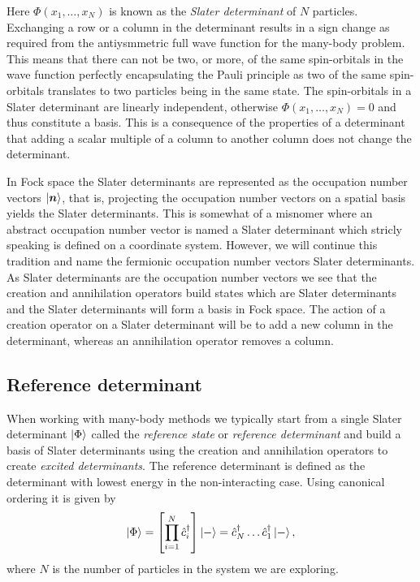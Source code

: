         Here $\Phi(x_1, \dots, x_N)$ is known as the \emph{Slater determinant}
        of $N$ particles.
        Exchanging a row or a column in the determinant results in a sign change
        as required from the antiysmmetric full wave function for the many-body
        problem.
        This means that there can not be two, or more, of the same spin-orbitals
        in the wave function perfectly encapsulating the Pauli principle as two
        of the same spin-orbitals translates to two particles being in the same
        state.
        The spin-orbitals in a Slater determinant are linearly independent,
        otherwise $\Phi(x_1, \dots, x_N) = 0$ and thus constitute a basis.
        This is a consequence of the properties of a determinant that adding a
        scalar multiple of a column to another column does not change the
        determinant.

        In Fock space the Slater determinants are represented as the occupation
        number vectors $\ket{\boldsymbol{n}}$, that is, projecting the occupation
        number vectors on a spatial basis yields the Slater determinants.
        This is somewhat of a misnomer where an abstract occupation number
        vector is named a Slater determinant which stricly speaking is defined
        on a coordinate system.
        However, we will continue this tradition and name the fermionic
        occupation number vectors Slater determinants.
        As Slater determinants are the occupation number vectors we see that the
        creation and annihilation operators build states which are Slater
        determinants and the Slater determinants will form a basis in Fock
        space.
        The action of a creation operator on a Slater determinant will be to add
        a new column in the determinant, whereas an annihilation operator
        removes a column.

        \subsection{Reference determinant}
            When working with many-body methods we typically start from a single
            Slater determinant $\ket{\Phi}$ called the \emph{reference state}
            or \emph{reference determinant} and build a basis of Slater
            determinants using the creation and annihilation operators to create
            \emph{excited determinants}.
            The reference determinant is defined as the determinant with lowest
            energy in the non-interacting case.
            Using canonical ordering it is given by
            \begin{align}
                \ket{\Phi}
                = \left[ 
                    \prod_{i = 1}^{N} \hat{c}_{i}^{\dagger}
                 \right] \ket{-}
                = \hat{c}_{N}^{\dagger}\dots\hat{c}_{1}^{\dagger}\ket{-},
            \end{align}
            where $N$ is the number of particles in the system we are exploring.

